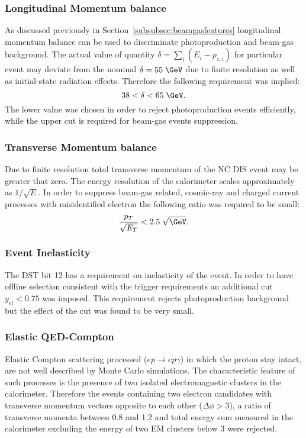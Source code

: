 \subsubsection{Longitudinal Momentum balance}
\label{subsubsec:empzcut}
As discussed previously in Section~\ref{subsubsec:beamgasfeatures} longitudinal momentum balance can be used to discriminate photoproduction and beam-gas background. The actual value of quantity $\delta=\sum_i{\left(E_i-p_{z,i}\right)}$ for particular event may deviate from the nominal $\delta=55\;\GeV$ due to finite resolution as well as initial-state radiation effects. Therefore the following requirement was implied:
\begin{equation}
38 < \delta < 65\;\GeV.
\label{eq:epmzcut}
\end{equation}
The lower value was chosen in order to reject photoproduction events efficiently, while the upper cut is required for beam-gas events suppression.

\subsubsection{Transverse Momentum balance}
\label{subsubsec:empzcut}
Due to finite resolution total transverse momentum of the NC DIS event may be greater that zero. The energy resolution of the calorimeter scales approximately as $1/\sqrt{E}$. In order to suppress beam-gas related, cosmic-ray and charged current processes with misidentified electron the following ratio was required to be small:
\begin{equation}
\frac{p_T}{\sqrt{E_T}} < 2.5\;\sqrt{\GeV}.
\label{eq:ptcut}
\end{equation}

\subsubsection{Event Inelasticity}
\label{subsubsec:yelcut}

The DST bit 12 has a requirement on inelasticity of the event. In order to have offline selection consistent with the trigger requirements an additional cut $y_{el} < 0.75$ was imposed. This requirement rejects photoproduction background but the effect of the cut was found to be very small.

\subsubsection{Elastic QED-Compton}
\label{subsubsec:elasticqedcut}
Elastic Compton scattering processed ($ep \rightarrow ep\gamma$) in which the proton stay intact, are not well described by Monte Carlo simulations. The characteristic feature of such processes is the presence of two isolated electromagnetic clusters in the calorimeter. Therefore the events containing two electron candidates with transverse momentum vectors opposite to each other ($\Delta\phi > 3$), a ratio of transverse momenta between 0.8 and 1.2 and total energy sum measured in the calorimeter excluding the energy of two EM clusters below 3 \GeV were rejected.

